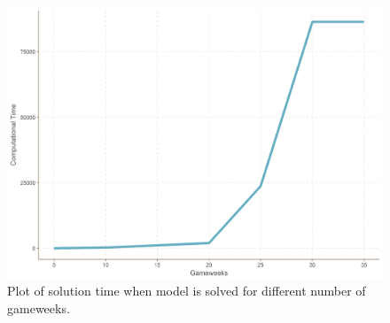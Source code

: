 \begin{table}[H]
\centering
{}
\caption{Model run with different number of gameweeks.}
\label{tab:realized_points_diff_gameweeks}
\end{table}

\begin{figure}[H]
    \centering
    \includegraphics[scale=0.3]{fig/chapter_7/comp_time.png}
    \caption{Plot of solution time when model is solved for different number of gameweeks.}
    \label{fig:comp_time_diff_gameweeks}   
\end{figure}




